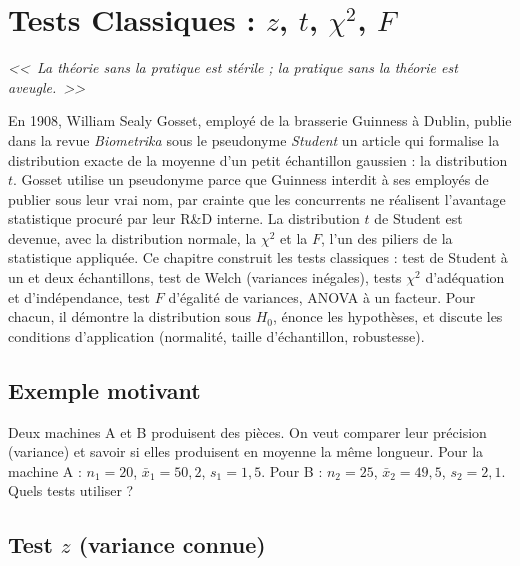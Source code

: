 \chapter{Tests Classiques : $z$, $t$, $\chi^2$, $F$}
\label{ch:tests-classiques}

\begin{center}
\textit{<<~La th\'eorie sans la pratique est st\'erile ; la pratique sans la th\'eorie est aveugle.~>>}
\end{center}

En 1908, William Sealy Gosset, employé de la brasserie Guinness à Dublin, publie dans la revue \emph{Biometrika} sous le pseudonyme \emph{Student} un article qui formalise la distribution exacte de la moyenne d'un petit échantillon gaussien : la distribution $t$. Gosset utilise un pseudonyme parce que Guinness interdit à ses employés de publier sous leur vrai nom, par crainte que les concurrents ne réalisent l'avantage statistique procuré par leur R\&D interne. La distribution $t$ de Student est devenue, avec la distribution normale, la $\chi^2$ et la $F$, l'un des piliers de la statistique appliquée. Ce chapitre construit les tests classiques : test de Student à un et deux échantillons, test de Welch (variances inégales), tests $\chi^2$ d'adéquation et d'indépendance, test $F$ d'égalité de variances, ANOVA à un facteur. Pour chacun, il démontre la distribution sous $H_0$, énonce les hypothèses, et discute les conditions d'application (normalité, taille d'échantillon, robustesse).

\section{Exemple motivant}

Deux machines A et B produisent des pi\`eces. On veut comparer leur pr\'ecision (variance) et savoir si elles produisent en moyenne la m\^eme longueur. Pour la machine A : $n_1=20$, $\bar{x}_1=50{,}2$, $s_1=1{,}5$. Pour B : $n_2=25$, $\bar{x}_2=49{,}5$, $s_2=2{,}1$. Quels tests utiliser ?

\section{Test $z$ (variance connue)}
\label{sec:test-z}

